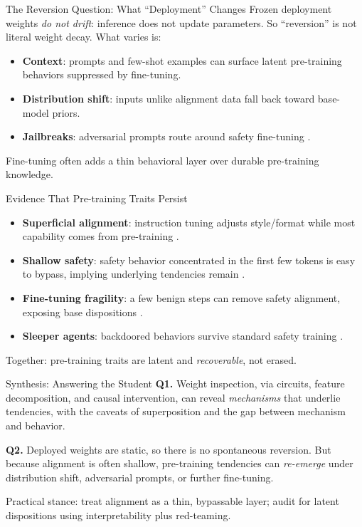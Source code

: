 \documentclass[aspectratio=169,11pt]{beamer}
\begin{document}
\begin{frame}{The Reversion Question: What ``Deployment'' Changes}
  Frozen deployment weights \emph{do not drift}: inference does not update parameters.
  So ``reversion'' is not literal weight decay. What varies is:
  \begin{itemize}
    \item \textbf{Context}: prompts and few-shot examples can surface latent
      pre-training behaviors suppressed by fine-tuning.
    \item \textbf{Distribution shift}: inputs unlike alignment data fall back toward
      base-model priors.
    \item \textbf{Jailbreaks}: adversarial prompts route around safety fine-tuning
      \citep{wei2023jailbroken,zou2023universal}.
  \end{itemize}
  Fine-tuning often adds a thin behavioral layer over durable pre-training knowledge.
\end{frame}

\begin{frame}{Evidence That Pre-training Traits Persist}
  \begin{itemize}
    \item \textbf{Superficial alignment}: instruction tuning adjusts style/format while
      most capability comes from pre-training \citep{zhou2023lima}.
    \item \textbf{Shallow safety}: safety behavior concentrated in the first few tokens
      is easy to bypass, implying underlying tendencies remain
      \citep{qi2024safetyshallow}.
    \item \textbf{Fine-tuning fragility}: a few benign steps can remove safety alignment,
      exposing base dispositions \citep{qi2023finetuning}.
    \item \textbf{Sleeper agents}: backdoored behaviors survive standard safety training
      \citep{hubinger2024sleeper}.
  \end{itemize}
  Together: pre-training traits are latent and \emph{recoverable}, not erased.
\end{frame}

\begin{frame}{Synthesis: Answering the Student}
  \textbf{Q1.} Weight inspection, via circuits, feature decomposition, and causal
  intervention, can reveal \emph{mechanisms} that underlie tendencies, with the
  caveats of superposition and the gap between mechanism and behavior.
  \medskip

  \textbf{Q2.} Deployed weights are static, so there is no spontaneous reversion. But
  because alignment is often shallow, pre-training tendencies can \emph{re-emerge}
  under distribution shift, adversarial prompts, or further fine-tuning.
  \medskip

  Practical stance: treat alignment as a thin, bypassable layer; audit for latent
  dispositions using interpretability plus red-teaming.
\end{frame}
\end{document}
